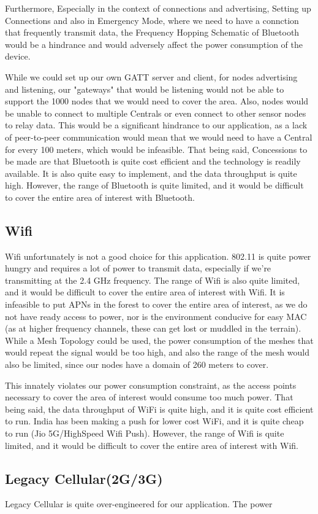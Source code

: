 Furthermore, Especially in the context of connections and advertising, Setting up Connections and also in Emergency Mode, where we need to have a connction that frequently transmit data, the Frequency Hopping Schematic of Bluetooth would be a hindrance and would adversely affect the power consumption of the device.

While we could set up our own GATT server and client, for nodes advertising and listening, our "gateways" that would be listening would not be able to support the 1000 nodes that we would need to cover the area. Also, nodes would be unable to connect to multiple Centrals or even connect to other sensor nodes to relay data. This would be a significant hindrance to our application, as a lack of peer-to-peer communication would mean that we would need to have a Central for every 100 meters, which would be infeasible.
That being said, Concessions to be made are that Bluetooth is quite cost efficient and the technology is readily available. It is also quite easy to implement, and the data throughput is quite high. However, the range of Bluetooth is quite limited, and it would be difficult to cover the entire area of interest with Bluetooth.
\subsection{Wifi}
Wifi unfortunately is not a good choice for this application. 802.11 is quite power hungry and requires a lot of power to transmit data, especially if we're transmitting at the 2.4 GHz frequency. The range of Wifi is also quite limited, and it would be difficult to cover the entire area of interest with Wifi. It is infeasible to put APNs in the forest to cover the entire area of interest, as we do not have ready access to power, nor is the environment conducive for easy MAC (as at higher frequency channels, these can get lost or muddled in the terrain). While a Mesh Topology could be used, the power consumption of the meshes that would repeat the signal would be too high, and also the range of the mesh would also be limited, since our nodes have a domain of 260 meters to cover. 

This innately violates our power consumption constraint, as the access points necessary to cover the area of interest would consume too much power. That being said, the data throughput of WiFi is quite high, and it is quite cost efficient to run. India has been making a push for lower cost WiFi, and it is quite cheap to run (Jio 5G/HighSpeed Wifi Push). However, the range of Wifi is quite limited, and it would be difficult to cover the entire area of interest with Wifi.

\subsection{Legacy Cellular(2G/3G)}
Legacy Cellular is quite over-engineered for our application. The power 

